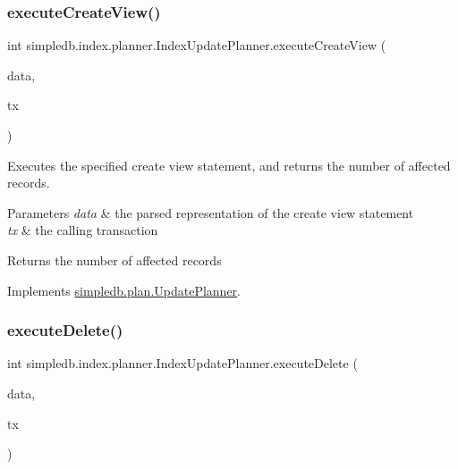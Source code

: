 \subsubsection{\texorpdfstring{execute\+Create\+View()}{executeCreateView()}}
{\footnotesize\ttfamily int simpledb.\+index.\+planner.\+Index\+Update\+Planner.\+execute\+Create\+View (\begin{DoxyParamCaption}\item[{\hyperlink{classsimpledb_1_1parse_1_1CreateViewData}{Create\+View\+Data}}]{data,  }\item[{\hyperlink{classsimpledb_1_1tx_1_1Transaction}{Transaction}}]{tx }\end{DoxyParamCaption})\hspace{0.3cm}{\ttfamily [inline]}}

Executes the specified create view statement, and returns the number of affected records. 
\begin{DoxyParams}{Parameters}
{\em data} & the parsed representation of the create view statement \\
\hline
{\em tx} & the calling transaction \\
\hline
\end{DoxyParams}
\begin{DoxyReturn}{Returns}
the number of affected records 
\end{DoxyReturn}


Implements \hyperlink{interfacesimpledb_1_1plan_1_1UpdatePlanner_a3f1e2a94b4ca0c9c4090989670fd111a}{simpledb.\+plan.\+Update\+Planner}.

\mbox{\label{classsimpledb_1_1index_1_1planner_1_1IndexUpdatePlanner_abc99996e4228128a9ce3a1588a35722a}} 
\subsubsection{\texorpdfstring{execute\+Delete()}{executeDelete()}}
{\footnotesize\ttfamily int simpledb.\+index.\+planner.\+Index\+Update\+Planner.\+execute\+Delete (\begin{DoxyParamCaption}\item[{\hyperlink{classsimpledb_1_1parse_1_1DeleteData}{Delete\+Data}}]{data,  }\item[{\hyperlink{classsimpledb_1_1tx_1_1Transaction}{Transaction}}]{tx }\end{DoxyParamCaption})\hspace{0.3cm}{\ttfamily [inline]}}


